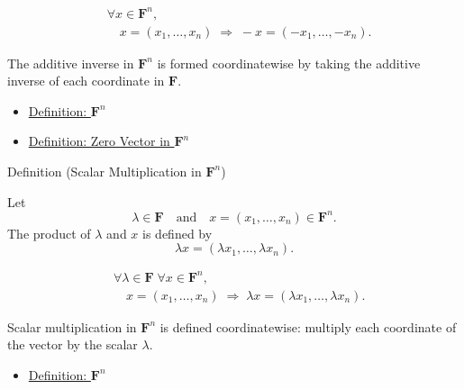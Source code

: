 \begin{remark*}
\[
\begin{aligned}
&\forall x \in \mathbf{F}^n, \\
&\quad
x=(x_1,\dots,x_n)
\;\Rightarrow\;
-x=(-x_1,\dots,-x_n).
\end{aligned}
\]
\end{remark*}

\begin{remark*}[Interpretation]
The additive inverse in $\mathbf{F}^n$ is formed coordinatewise by taking
the additive inverse of each coordinate in $\mathbf{F}$.
\end{remark*}

\begin{remark*}[Dependencies]
\begin{itemize}
  \item \hyperref[def:Fn]{Definition: $\mathbf{F}^n$}
  \item \hyperref[def:zero-vector-in-Fn]{Definition: Zero Vector in $\mathbf{F}^n$}
\end{itemize}
\end{remark*}


\begin{definitionbox}{Definition (Scalar Multiplication in $\mathbf{F}^n$)}
\begin{definition}
\label{def:scalar-multiplication-in-Fn}
Let
\[
\lambda \in \mathbf{F}
\quad\text{and}\quad
x=(x_1,\dots,x_n)\in \mathbf{F}^n.
\]
The product of $\lambda$ and $x$ is defined by
\[
\lambda x
=
(\lambda x_1,\dots,\lambda x_n).
\]
\end{definition}
\end{definitionbox}

\begin{remark*}
\[
\begin{aligned}
&\forall \lambda \in \mathbf{F}\;\forall x \in \mathbf{F}^n, \\
&\quad
x=(x_1,\dots,x_n)
\;\Rightarrow\;
\lambda x=(\lambda x_1,\dots,\lambda x_n).
\end{aligned}
\]
\end{remark*}

\begin{remark*}[Interpretation]
Scalar multiplication in $\mathbf{F}^n$ is defined coordinatewise: multiply
each coordinate of the vector by the scalar \(\lambda\).
\end{remark*}

\begin{remark*}[Dependencies]
\begin{itemize}
  \item \hyperref[def:Fn]{Definition: $\mathbf{F}^n$}
\end{itemize}
\end{remark*}
